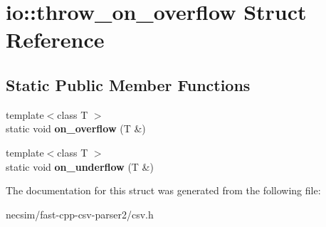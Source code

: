 \hypertarget{structio_1_1throw__on__overflow}{}\section{io\+:\+:throw\+\_\+on\+\_\+overflow Struct Reference}
\label{structio_1_1throw__on__overflow}
\subsection*{Static Public Member Functions}
\begin{DoxyCompactItemize}
\item 
{\footnotesize template$<$class T $>$ }\\static void {\bfseries on\+\_\+overflow} (T \&)\hypertarget{structio_1_1throw__on__overflow_a0a59c1dc2ead1a9275c62885ec7545d2}{}\label{structio_1_1throw__on__overflow_a0a59c1dc2ead1a9275c62885ec7545d2}

\item 
{\footnotesize template$<$class T $>$ }\\static void {\bfseries on\+\_\+underflow} (T \&)\hypertarget{structio_1_1throw__on__overflow_a2ae91b1ae3d655c16f7e6a7e9a1abd92}{}\label{structio_1_1throw__on__overflow_a2ae91b1ae3d655c16f7e6a7e9a1abd92}

\end{DoxyCompactItemize}


The documentation for this struct was generated from the following file\+:\begin{DoxyCompactItemize}
\item 
necsim/fast-\/cpp-\/csv-\/parser2/csv.\+h\end{DoxyCompactItemize}
